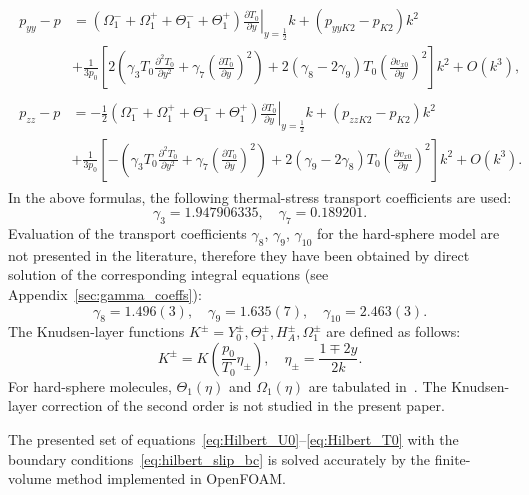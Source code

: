 \documentclass[final]{jfm} %
\newcommand{\pder}[2][]{\frac{\partial#1}{\partial#2}}
\newcommand{\pderdual}[2][]{\frac{\partial^2#1}{\partial#2^2}}
\newcommand{\OO}[1]{O\left(#1\right)}
\begin{document}
\begin{gather}
    \begin{aligned}
    p_{yy} - p &= (\Omega_1^-+\Omega_1^+ + \Theta_1^-+\Theta_1^+)\left.\pder[T_0]{y}\right|_{y=\frac12}k
        + (p_{yyK2}-p_{K2})k^2 \\
        &+ \frac1{3p_0}\left[2\left(\gamma_3 T_0 \pderdual[T_0]{y} + \gamma_7\left(\pder[T_0]{y}\right)^2\right)
        + 2(\gamma_8-2\gamma_9)T_0\left(\pder[v_{x0}]{y}\right)^2\right]k^2 + \OO{k^3},
    \end{aligned}\label{eq:Hilbert_Pyy}\\
    \begin{aligned}
    p_{zz} - p &= -\frac12 (\Omega_1^-+\Omega_1^+ + \Theta_1^-+\Theta_1^+)\left.\pder[T_0]{y}\right|_{y=\frac12}k
        + (p_{zzK2}-p_{K2})k^2 \\
        &+ \frac1{3p_0}\left[-\left(\gamma_3 T_0 \pderdual[T_0]{y} + \gamma_7\left(\pder[T_0]{y}\right)^2\right)
        + 2(\gamma_9-2\gamma_8)T_0\left(\pder[v_{x0}]{y}\right)^2\right]k^2 + \OO{k^3}.
    \end{aligned}\label{eq:Hilbert_Pzz}
\end{gather}
In the above formulas, the following thermal-stress transport coefficients are used:
\begin{equation}\label{eq:gamma_tabular}
    \gamma_3 = 1.947906335, \quad \gamma_7 = 0.189201.
\end{equation}
Evaluation of the transport coefficients \(\gamma_8\), \(\gamma_9\), \(\gamma_{10}\)
for the hard-sphere model are not presented in the literature,
therefore they have been obtained by direct solution of the corresponding integral equations
(see Appendix~\ref{sec:gamma_coeffs}):
\begin{equation}\label{eq:gamma_numerical}
    \gamma_8 = 1.496(3), \quad \gamma_9 = 1.635(7), \quad \gamma_{10} = 2.463(3).
\end{equation}
The Knudsen-layer functions \(K^\pm = Y_0^\pm, \Theta_1^\pm, H_A^\pm, \Omega_1^\pm\)
are defined as follows:
\begin{equation}\label{eq:nonlinear_knudsen_functions}
     K^\pm = K\left(\frac{p_0}{T_0}\eta_\pm\right), \quad \eta_\pm = \frac{1 \mp 2y}{2k}.
\end{equation}
For hard-sphere molecules, \(\Theta_1(\eta)\) and \(\Omega_1(\eta)\)
are tabulated in~\citet{Ohwada1992, Sone2002, Sone2007, Takata2015}.
The Knudsen-layer correction of the second order is not studied in the present paper.

The presented set of equations~\eqref{eq:Hilbert_U0}--\eqref{eq:Hilbert_T0}
with the boundary conditions~\eqref{eq:hilbert_slip_bc}
is solved accurately by the finite-volume method
implemented in OpenFOAM\textregistered{}.
\end{document}
